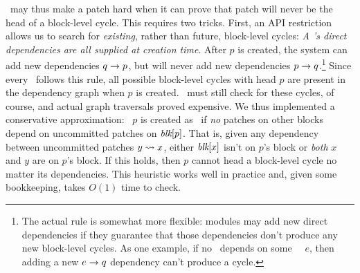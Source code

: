\Featherstitch\ may thus make a patch hard when it can prove that patch
 will never be the head of a block-level cycle.
%
This requires two tricks.
%
First, an API restriction allows us to search for \emph{existing},
 rather than future, block-level cycles:
%
\emph{A \patch's direct dependencies are all supplied at creation time}.
%
After $p$ is created, the system can add new dependencies $q \rightarrow p$,
 but will never add new dependencies $p \rightarrow q$.\footnote{The actual
 rule is somewhat more flexible: modules may add new direct dependencies if
 they guarantee that those dependencies don't produce any new block-level
 cycles.  As one example, if no \patch\ depends on some \noop\ \patch\ $e$,
 then adding a new $e \rightarrow q$ dependency can't produce a cycle.}
%
Since every \patch\ follows this rule, all possible block-level cycles with
 head $p$ are present in the dependency graph when $p$ is created.
%
\Featherstitch\ must still check for these cycles, of course, and
%
actual graph traversals proved expensive.
%
We thus implemented a conservative approximation: \patch\ $p$ is
created as \nrb\ if \emph{no} patches on other blocks depend on uncommitted
 patches on $\textit{blk}[{p}]$.
%
That is, given any dependency between uncommitted patches $y \leadsto x$,
 either $\textit{blk}[{x}]$ isn't on $p$'s block or \emph{both} $x$ and $y$ are on
 $p$'s block.
%
If this holds, then $p$ cannot head a block-level cycle no matter its
 dependencies.
%
This heuristic works well in practice and, given some bookkeeping, 
 takes $O(1)$ time to check.


\begin{comment}
\Kudos\ further ensures that the dependency structure correctly
represents dependencies on the same block through overlap
dependencies: since \nrb\ \patches\ are considered to cover the entire
block, every succeeding \patch\ will overlap at least one \nrb\ \patch,
and \Kudos\ will automatically add a dependency.
%
(Some cases are handled by other optimizations.)


The buffer cache's ``write block'' behavior must account for \nrb\
\patches, as it \emph{must} write any \nrb\ \patches\ that exist on a
block.
%
Let $\PHard[b]$ be the set of \nrb\ \patches\ on block $b$.
%
Then to write block $b$, the buffer cache must choose some $P \subseteq
\PMem[b]$ with
%
\[ \PDepset{P} \subseteq P \cup \PDisk \text{ and } \PHard[b] \cap \PMem
\subseteq P. \]
%
If no such $P$ exists, then the cache must write a different block.
\end{comment}


